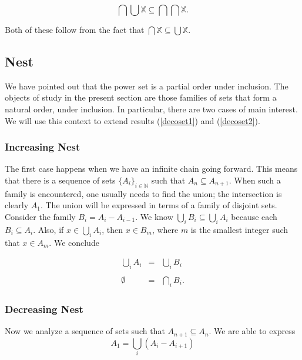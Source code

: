 \documentclass [12pt]{book}
\begin{document}
\begin{equation}\bigcap\bigcup\mathbb{X}\subseteq\bigcap\bigcap \mathbb{X}\label{ex2st}.\end{equation}

Both of these follow from the fact that $\bigcap\mathbb{X}\subseteq\bigcup\mathbb{X}$. 


	\subsection{Nest}

We have pointed out that the power set is a partial order under inclusion. The objects of study in the present section are those families of sets that form a natural order, under inclusion. In particular, there are two cases of main interest. We will use this context to extend results (\ref{decoset1}) and (\ref{decoset2}).

		\subsubsection{Increasing Nest}

The first case happens when we have an infinite chain going forward. This means that there is a sequence of sets $\{A_i\}_{i\in\mathbb{N}}$ such that $A_n\subseteq A_{n+1}$. When such a family is encountered, one usually needs to find the union; the intersection is clearly $A_{1}$. The union will be expressed in terms of a family of disjoint sets. Consider the family $B_{i}=A_{i}-A_{i-1}$. We know $\bigcup_{i}B_i\subseteq\bigcup_iA_i$ because each $B_i\subseteq A_i$. Also, if $x\in\bigcup_iA_i$, then $x\in B_m$, where $m$ is the smallest integer such that $x\in A_{m}$. We conclude

\begin{eqnarray}\bigcup_iA_i&=&\bigcup_iB_i\\\nonumber
\\\nonumber\emptyset&=&\bigcap_iB_i.\end{eqnarray}

\subsubsection{Decreasing Nest}

Now we analyze a sequence of sets such that $A_{n+1}\subseteq A_n$. We are able to express \begin{equation}A_{1}=\bigcup_i(A_{i}-A_{i+1})\end{equation}
\end{document}
